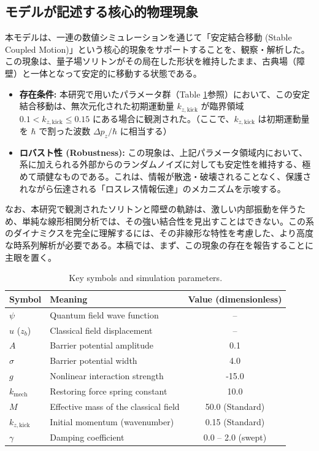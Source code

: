 \documentclass[a4paper,11pt,ja=standard]{bxjsarticle}
\begin{document}
\subsection{モデルが記述する核心的物理現象}
本モデルは、一連の数値シミュレーションを通じて「安定結合移動 (Stable Coupled Motion)」という核心的現象をサポートすることを、観察・解析した。この現象は、量子場ソリトンがその局在した形状を維持したまま、古典場（障壁）と一体となって安定的に移動する状態である。
\begin{itemize}
    \item \textbf{存在条件:}
    本研究で用いたパラメータ群（Table \ref{tab:params}参照）において、この安定結合移動は、無次元化された初期運動量 $k_{z,\text{kick}}$ が臨界領域 $0.1 < k_{z,\text{kick}} \leq 0.15$ にある場合に観測された。（ここで、$k_{z,\text{kick}}$ は初期運動量を $\hbar$ で割った波数 $\Delta p_z/\hbar$ に相当する）

    \item \textbf{ロバスト性 (Robustness):}
    この現象は、上記パラメータ領域内において、系に加えられる外部からのランダムノイズに対しても安定性を維持する、極めて頑健なものである。これは、情報が散逸・破壊されることなく、保護されながら伝達される「ロスレス情報伝達」のメカニズムを示唆する。
\end{itemize}

\noindent
なお、本研究で観測されたソリトンと障壁の軌跡は、激しい内部振動を伴うため、単純な線形相関分析では、その強い結合性を見出すことはできない。この系のダイナミクスを完全に理解するには、その非線形な特性を考慮した、より高度な時系列解析が必要である。本稿では、まず、この現象の存在を報告することに主眼を置く。

\begin{table}[h!]
\centering
\caption{Key symbols and simulation parameters.}
\label{tab:params}
\begin{tabular}{l l c}
\hline\hline
Symbol & Meaning & Value (dimensionless) \\ \hline
$\psi$ & Quantum field wave function & – \\
$u$ ($z_b$) & Classical field displacement & – \\
$A$ & Barrier potential amplitude & 0.1 \\
$\sigma$ & Barrier potential width & 4.0 \\
$g$ & Nonlinear interaction strength & -15.0 \\
$k_{\text{mech}}$ & Restoring force spring constant & 10.0 \\
$M$ & Effective mass of the classical field & 50.0 (Standard) \\
$k_{z,\text{kick}}$ & Initial momentum (wavenumber) & 0.15 (Standard) \\
$\gamma$ & Damping coefficient & 0.0 -- 2.0 (swept) \\ \hline\hline
\end{tabular}
\end{table}
\end{document}
